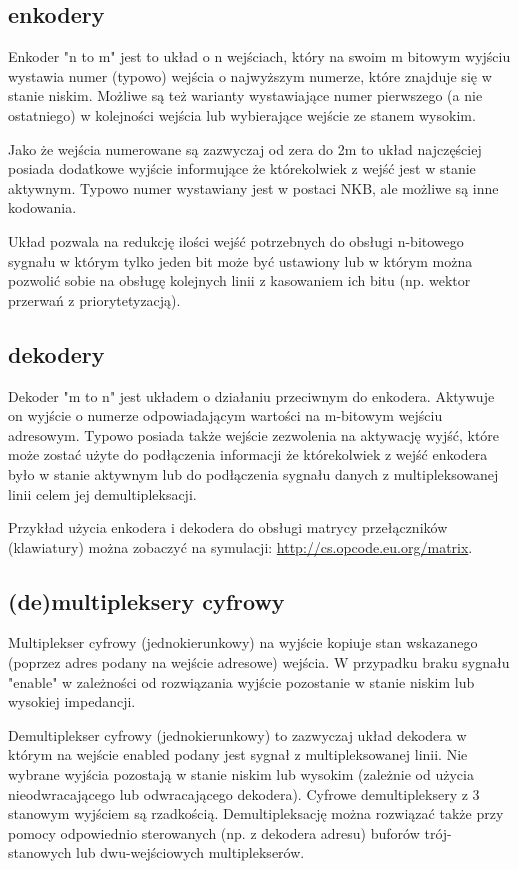 \subsection{enkodery}

Enkoder "n to m" jest to układ o n wejściach, który na swoim m bitowym wyjściu wystawia numer (typowo) wejścia o najwyższym numerze, które znajduje się w stanie niskim. Możliwe są też warianty wystawiające numer pierwszego (a nie ostatniego) w kolejności wejścia lub wybierające wejście ze stanem wysokim.

Jako że wejścia numerowane są zazwyczaj od zera do 2m to układ najczęściej posiada dodatkowe wyjście informujące że którekolwiek z wejść jest w stanie aktywnym. Typowo numer wystawiany jest w postaci NKB, ale możliwe są inne kodowania.

Układ pozwala na redukcję ilości wejść potrzebnych do obsługi n-bitowego sygnału w którym tylko jeden bit może być ustawiony lub w którym można pozwolić sobie na obsługę kolejnych linii z kasowaniem ich bitu (np. wektor przerwań z priorytetyzacją).

\subsection{dekodery}

Dekoder "m to n" jest układem o działaniu przeciwnym do enkodera. Aktywuje on wyjście o numerze odpowiadającym wartości na m-bitowym wejściu adresowym. Typowo posiada także wejście zezwolenia na aktywację wyjść, które może zostać użyte do podłączenia informacji że którekolwiek z wejść enkodera było w stanie aktywnym lub do podłączenia sygnału danych z multipleksowanej linii celem jej demultipleksacji.

Przykład użycia enkodera i dekodera do obsługi matrycy przełączników (klawiatury) można zobaczyć na symulacji: \url{http://cs.opcode.eu.org/matrix}.

\subsection{(de)multipleksery cyfrowy}

Multiplekser cyfrowy (jednokierunkowy) na wyjście kopiuje stan wskazanego (poprzez adres podany na wejście adresowe) wejścia. W przypadku braku sygnału "enable" w zależności od rozwiązania wyjście pozostanie w stanie niskim lub wysokiej impedancji.

Demultiplekser cyfrowy (jednokierunkowy) to zazwyczaj układ dekodera w którym na wejście enabled podany jest sygnał z multipleksowanej linii. Nie wybrane wyjścia pozostają w stanie niskim lub wysokim (zależnie od użycia nieodwracającego lub odwracającego dekodera). Cyfrowe demultipleksery z 3 stanowym wyjściem są rzadkością. Demultipleksację można rozwiązać także przy pomocy odpowiednio sterowanych (np. z dekodera adresu) buforów trój-stanowych lub dwu-wejściowych multiplekserów.


